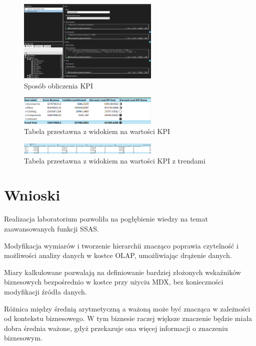 \documentclass[a4paper,12pt]{article}
\begin{document}
\begin{figure}[H]
  \includegraphics[width=0.6\textwidth]{images/5b.png}
  \caption{Sposób obliczenia KPI}
\end{figure}

\begin{figure}[H]
  \includegraphics[width=0.6\textwidth]{images/5b_analysis.png}
  \caption{Tabela przestawna z widokiem na wartości KPI}
\end{figure}

\begin{figure}[H]
  \includegraphics[width=0.6\textwidth]{images/5b_analysis_2.png}
  \caption{Tabela przestawna z widokiem na wartości KPI z trendami}
\end{figure}

\section{Wnioski}

Realizacja laboratorium pozwoliła na pogłębienie wiedzy na temat zaawansowanych funkcji SSAS.

Modyfikacja wymiarów i tworzenie hierarchii znacząco poprawia czytelność i możliwości analizy danych w kostce OLAP, umożliwiając drążenie danych.

Miary kalkulowane pozwalają na definiowanie bardziej złożonych wskaźników biznesowych bezpośrednio w kostce przy użyciu MDX, bez konieczności modyfikacji źródła danych.

Różnica między średnią arytmetyczną a ważoną może być znacząca w zależności od kontekstu biznesowego. W tym biznesie raczej większe znaczenie będzie miała dobra średnia ważone, gdyż przekazuje ona więcej informacji o znaczeniu biznesowym.
\end{document}
